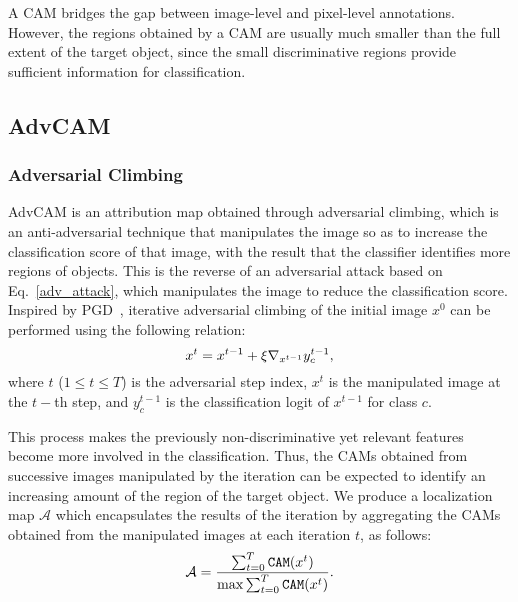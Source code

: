 \documentclass[final]{cvpr}
\begin{document}
A CAM bridges the gap between image-level and pixel-level annotations. However, the regions obtained by a CAM are usually much smaller than the full extent of the target object, since the small discriminative regions provide sufficient information for classification.

\subsection{AdvCAM}\label{Advcam_method}
\subsubsection{Adversarial Climbing}
AdvCAM is an attribution map obtained through adversarial climbing, which is an anti-adversarial technique that manipulates the image so as to increase the classification score of that image, with the result that the classifier identifies more regions of objects.
This is the reverse of an adversarial attack based on Eq.~\ref{adv_attack}, which manipulates the image to reduce the classification score. 
Inspired by PGD~\cite{kurakin2016adversarial}, iterative adversarial climbing of the initial image $x^{0}$ can be performed using the following relation:
\vspace{-0.1em}
\begin{equation}\label{sgd}
x^{t} = x^{t-1} + \xi \nabla_{x^{t-1}} y_c^{t-1},
\vspace{-0.2em}
\end{equation}
where $t$ ($1\leq t \leq T$) is the adversarial step index, $x^{t}$ is the manipulated image at the $t-$th step, and $y_c^{t-1}$ is the classification logit of $x^{t-1}$ for class $c$. 

This process makes the previously non-discriminative yet relevant features become more involved in the classification.
Thus, the CAMs obtained from successive images manipulated by the iteration can be expected to identify an increasing amount of the region of the target object.
We produce a localization map $\mathcal{A}$ which encapsulates the results of the iteration by aggregating the CAMs obtained from the manipulated images at each iteration $t$, as follows: 
\vspace{-0.3em}
\begin{align}\label{aggregate}
\mathcal{A} = 
\frac{\sum_{t=0}^{T} \texttt{CAM}(x^{t})}{\max \sum_{t=0}^{T} \texttt{CAM}(x^{t})}.
\vspace{-0.5em}
\end{align}
\end{document}

